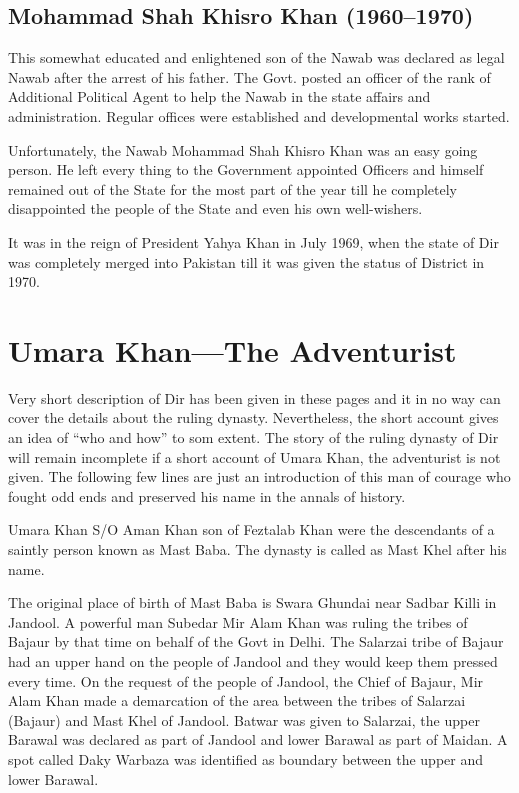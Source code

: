\documentclass[twoside,openright]{book}
\begin{document}
\section{Mohammad Shah Khisro Khan (1960--1970)}

This somewhat educated and enlightened son of the Nawab was declared as legal
Nawab after the arrest of his father. The Govt. posted an officer of the rank of
Additional Political Agent to help the Nawab in the state affairs and
administration. Regular offices were established and developmental works
started.

Unfortunately, the Nawab Mohammad Shah Khisro Khan was an easy going person. He
left every thing to the Government appointed Officers and himself remained out
of the State for the most part of the year till he completely disappointed the
people of the State and even his own well-wishers.

It was in the reign of President Yahya Khan in July 1969, when the state of Dir
was completely merged into Pakistan till it was given the status of District in
1970.

\chapter{Umara Khan---The Adventurist}

Very short description of Dir has been given in these pages and it in no way can
cover the details about the ruling dynasty. Nevertheless, the short account
gives an idea of ``who and how'' to som extent. The story of the ruling dynasty
of Dir will remain incomplete if a short account of Umara Khan, the adventurist
is not given. The following few lines are just an introduction of this man of
courage who fought odd ends and preserved his name in the annals of history.

Umara Khan S/O Aman Khan son of Feztalab Khan were the descendants of a saintly
person known as Mast Baba. The dynasty is called as Mast Khel after his name.

The original place of birth of Mast Baba is Swara Ghundai near Sadbar Killi in
Jandool. A powerful man Subedar Mir Alam Khan was ruling the tribes of Bajaur by
that time on behalf of the Govt in Delhi. The Salarzai tribe of Bajaur had an
upper hand on the people of Jandool and they would keep them pressed every time.
On the request of the people of Jandool, the Chief of Bajaur, Mir Alam Khan made
a demarcation of the area between the tribes of Salarzai (Bajaur) and Mast Khel
of Jandool. Batwar was given to Salarzai, the upper Barawal was declared as part
of Jandool and lower Barawal as part of Maidan. A spot called Daky Warbaza was
identified as boundary between the upper and lower Barawal.
\end{document}
